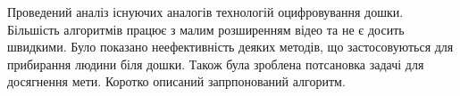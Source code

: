 \chapterConclusion

Проведений аналіз існуючих аналогів технологій оцифровування дошки.
Більшість алгоритмів працює з малим розширенням відео та не є 
досить швидкими. Було показано неефективність деяких методів, 
що застосовуються для прибирання людини біля дошки. 
Також була зроблена потсановка задачі для досягнення мети.
Коротко описаний запрпонований алгоритм.